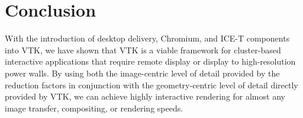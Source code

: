 \documentclass[letterpaper]{acmsiggraph}
\newcommand{\sticky}[1]{}
\newcommand{\cidentifier}[1]{\texttt{#1}}
\begin{document}
  \section{Conclusion}
  \label{sec:conclusion}

  With the introduction of desktop delivery, Chromium, and ICE-T components
  into VTK, we have shown that VTK is a viable framework for cluster-based
  interactive applications that require remote display or display to
  high-resolution power walls.  By using both the image-centric level of
  detail provided by the reduction factors in conjunction with the
  geometry-centric level of detail directly provided by VTK, we can achieve
  highly interactive rendering for almost any image transfer, compositing,
  or rendering speeds.  \sticky{Some empirical evidence, i.e. with LLNL
  data, would probably be good here.  But how?  You really need a video and
  see it in action.}


\end{document}
